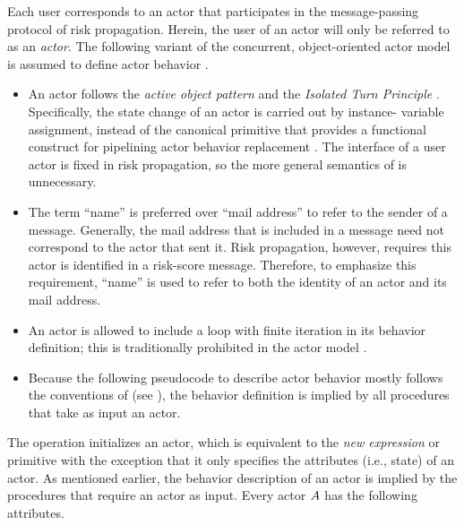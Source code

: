 Each user corresponds to an actor that participates in the message-passing protocol of risk propagation. Herein, the user of an actor will only be referred to as an \emph{actor}. The following variant of the concurrent, object-oriented actor model is assumed to define actor behavior \cite{Agha1990}.
%
\begin{itemize}
	\item An actor follows the \emph{active object pattern} \cite{Lavender1996, Koster2016} and the \emph{Isolated Turn Principle} \cite{Koster2016}. Specifically, the state change of an actor is carried out by instance- variable assignment, instead of the canonical \cBecome{} primitive that provides a functional construct for pipelining actor behavior replacement \cite{Agha1985, Agha1990}. The interface of a user actor is fixed in risk propagation, so the more general semantics of \cBecome{} is unnecessary.
	\item The term ``name'' \cite{Hewitt1977, Agha1985} is preferred over ``mail address'' \cite{Agha1985, Agha1990} to refer to the sender of a message. Generally, the mail address that is included in a message need not correspond to the actor that sent it. Risk propagation, however, requires this actor is identified in a risk-score message. Therefore, to emphasize this requirement, ``name'' is used to refer to both the identity of an actor and its mail address.
	\item An actor is allowed to include a loop with finite iteration in its behavior definition; this is traditionally prohibited in the actor model \cite{Agha1985, Agha1990}.
	\item Because the following pseudocode to describe actor behavior mostly follows the conventions of \cite{Cormen2022} (see ), the behavior definition is implied by all procedures that take as input an actor.
\end{itemize}
%
The \cCreateActor{} operation initializes an actor, which is equivalent to the \emph{new expression} \cite{Agha1985} or \cCreate{} primitive \cite{Agha1990} with the exception that it only specifies the attributes (i.e., state) of an actor. As mentioned earlier, the behavior description of an actor is implied by the procedures that require an actor as input. Every actor $A$ has the following attributes.
%

